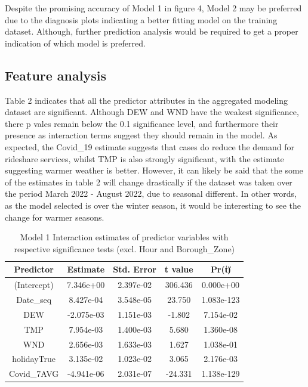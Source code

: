 \documentclass[11pt]{article}
\begin{document}
Despite the promising accuracy of Model 1 in figure 4, Model 2 may be preferred due to the diagnosis plots indicating a better fitting model on the training dataset. Although, further prediction analysis would be required to get a proper indication of which model is preferred. 

\subsection{Feature analysis}
Table 2 indicates that all the predictor attributes in the aggregated modeling dataset are significant. Although DEW and WND have the weakest significance, there p vales remain below the 0.1 significance level, and furthermore their presence as interaction terms suggest they should remain in the model. As expected, the Covid\_19 estimate suggests that cases do reduce the demand for rideshare services, whilst TMP is also strongly significant, with the estimate suggesting warmer weather is better. However, it can likely be said that the some of the estimates in table 2 will change drastically if the dataset was taken over the period March 2022 - August 2022, due to seasonal different. In other words, as the model selected is over the winter season, it would be interesting to see the change for warmer seasons. 
\begin{table}[h]
\centering
\begin{tabular}{||c c c c c||} 
 \hline
 Predictor & Estimate &  Std. Error & t value & Pr(\|t\|)\\ [0.5ex] 
 \hline\hline
 (Intercept) & 7.346e+00 & 2.397e-02 & 306.436 & 0.000e+00  \\ 
 \hline
 Date\_seq & 8.427e-04 & 3.548e-05 & 23.750 & 1.083e-123 \\
 \hline
 DEW  & -2.075e-03 & 1.151e-03 & -1.802 & 7.154e-02 \\
 \hline
 TMP & 7.954e-03 &  1.400e-03 & 5.680 & 1.360e-08 \\
 \hline
 WND & 2.656e-03 & 1.633e-03 &  1.627 & 1.038e-01 \\
 \hline
 holidayTrue  & 3.135e-02 & 1.023e-02 & 3.065 & 2.176e-03 \\
 \hline
 Covid\_7AVG & -4.941e-06 & 2.031e-07 & -24.331 & 1.138e-129 \\
 \hline
\end{tabular}
\caption{\label{tab:table-name}Model 1 Interaction estimates of predictor variables with respective significance tests (excl. Hour and Borough\_Zone)}
\end{table}
\end{document}
